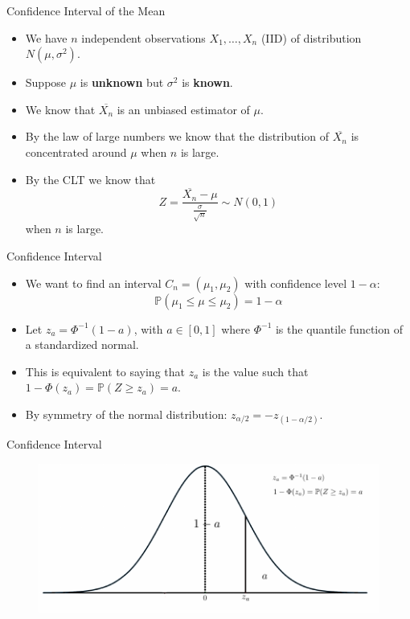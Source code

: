 \documentclass[handout]{beamer}
\begin{document}
\begin{frame}{Confidence Interval of the Mean }
\scriptsize{
\begin{itemize}
 \item We have $n$ independent observations $X_1, \dots, X_n$ (IID) of distribution $N(\mu,\sigma^2)$.
\item Suppose $\mu$ is \textbf{unknown} but $\sigma^2$ is \textbf{known}.
 \item We know that $\overline{X_{n}}$ is an unbiased estimator of $\mu$.
 \item By the law of large numbers we know that the distribution of $\overline{X_{n}}$ is concentrated around $\mu$ when $n$ is large.
 \item By the CLT we know that \begin{displaymath}
 Z=\frac{\overline{X_{n}}-\mu}{\frac{\sigma}{\sqrt{n}}}  \sim N(0,1)
\end{displaymath}
when $n$ is large.
\end{itemize}


 }
\end{frame}

\begin{frame}{Confidence Interval}
\scriptsize{
\begin{itemize}
 \item We want to find an interval $C_n = (\mu_1,\mu_2)$ with confidence level $1-\alpha$:
\begin{displaymath}
 \mathbb{P}(\mu_1 \leq \mu \leq \mu_2 ) = 1-\alpha
\end{displaymath}
\item Let $z_a = \Phi^{-1}(1-a)$, with $a \in [0,1]$ where $\Phi^{-1}$ is the quantile function of a standardized normal.
\item This is equivalent to saying that $z_a$ is the value such that $1-\Phi(z_a)=\mathbb{P}(Z \geq z_a)=a$.

\item By symmetry of the normal distribution: $z_{\alpha/2}=-z_{(1-\alpha/2)}$.
\end{itemize}


 }
\end{frame}



\begin{frame}{Confidence Interval}


\begin{figure}[h!]
	\centering
	\includegraphics[scale=0.8]{pics/conf_int_1.pdf}
\end{figure}


 
\end{frame}
\end{document}
